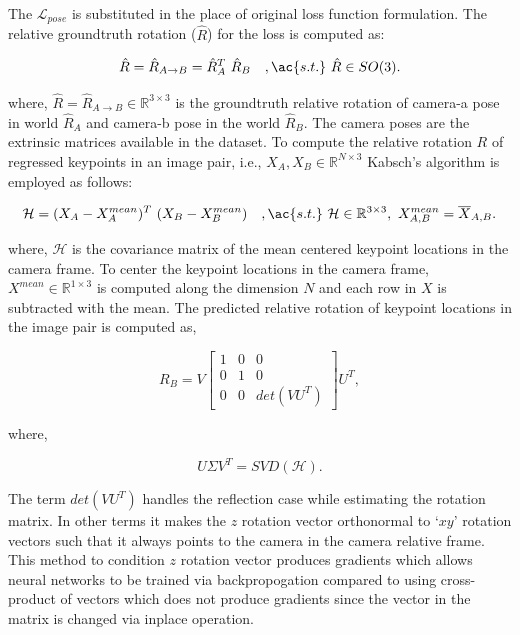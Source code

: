 The $\mathcal{L}_{pose}$ is substituted in the place of original loss function formulation.
The relative groundtruth rotation ($\hat{R}$) for the loss is computed as:

\begin{equation}
    \hat{R} = \hat{R}_{A \rightarrow B} = \hat{R}_A^{T} \ \hat{R}_B \quad,\ac{s.t.} \ \hat{R} \in SO(3).
\end{equation}

\noindent where, $\hat{R} = \hat{R}_{A \rightarrow B} \in \mathbb{R}^{3 \times 3}$ is the groundtruth relative rotation of camera-a pose in world $\hat{R}_A$ and camera-b pose in the world $\hat{R}_B$.
The camera poses are the extrinsic matrices available in the dataset. To compute the relative rotation $R$ of regressed keypoints
in an image pair, i.e., $X_A, X_B \in \mathbb{R}^{N \times 3}$ Kabsch's algorithm \cite{kabsch} is employed as follows:

\begin{equation}
    \mathcal{H} = (X_A - X_A^{mean})^T \ (X_B - X_B^{mean}) \quad,\ac{s.t.} \ \mathcal{H} \in \mathbb{R}^{3 \times 3}, \ X^{mean}_{A,B} = \overline{X}_{A,B}.
\end{equation}

\noindent where, $\mathcal{H}$ is the covariance matrix of the mean centered keypoint locations in the camera frame. To center the keypoint locations in the camera frame,
$X^{mean} \in \mathbb{R}^{1 \times 3}$ is computed along the dimension $N$ and each row in $X$ is subtracted with the mean.
The predicted relative rotation of keypoint locations in the image pair is computed as,

\begin{equation}
    R_B = V \begin{bmatrix}
        1 & 0 & 0          \\
        0 & 1 & 0          \\
        0 & 0 & det(V U^T)
    \end{bmatrix} U^T,
\end{equation}

where,

\begin{equation}
    U \Sigma V^T = SVD(\mathcal{H}).
\end{equation}

The term $det(V U^T)$ handles the reflection case while estimating the rotation matrix. In other terms it makes the $z$ rotation vector orthonormal to `$xy$'
rotation vectors such that it always points to the camera in the camera relative frame. This method to condition $z$ rotation vector produces gradients which allows neural networks
to be trained via backpropogation compared to using cross-product of vectors which does not produce gradients since the vector in the matrix is changed via inplace operation.










